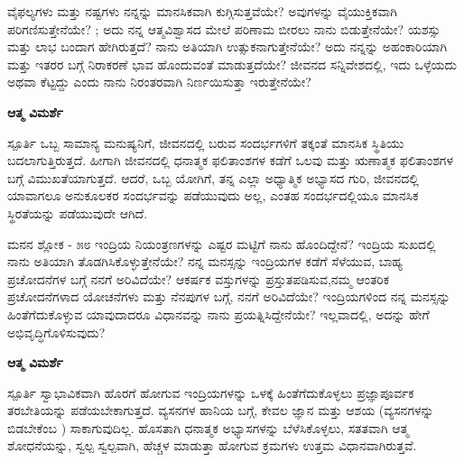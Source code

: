 \newpage
\begin{mananam}{}
\footnotesize \mananamtext ವೈಫಲ್ಯಗಳು ಮತ್ತು ನಷ್ಟಗಳು ನನ್ನನ್ನು ಮಾನಸಿಕವಾಗಿ  ಕುಗ್ಗಿಸುತ್ತವೆಯೇ? ಅವುಗಳನ್ನು ವೈಯುಕ್ತಿಕವಾಗಿ ಪರಿಗಣಿಸುತ್ತೇನೆಯೇ? ; ಅದು ನನ್ನ ಆತ್ಮವಿಶ್ವಾಸದ ಮೇಲೆ ಪರಿಣಾಮ ಬೀರಲು ನಾನು ಬಿಡುತ್ತೇನೆಯೇ? ಯಶಸ್ಸು ಮತ್ತು ಲಾಭ ಬಂದಾಗ ಹೇಗಿರುತ್ತದೆ? ನಾನು ಅತಿಯಾಗಿ  ಉತ್ಸುಕನಾಗುತ್ತೇನೆಯೇ? ಅದು ನನ್ನನ್ನು ಅಹಂಕಾರಿಯಾಗಿ ಮತ್ತು ಇತರರ ಬಗ್ಗೆ ನಿರಾಕರಣೆ ಭಾವ ಹೊಂದುವಂತೆ ಮಾಡುತ್ತದೆಯೇ? ಜೀವನದ ಸನ್ನಿವೇಶದಲ್ಲಿ, ಇದು ಒಳ್ಳೆಯದು ಅಥವಾ ಕೆಟ್ಟದ್ದು ಎಂದು ನಾನು ನಿರಂತರವಾಗಿ ನಿರ್ಣಯಿಸುತ್ತಾ ಇರುತ್ತೇನೆಯೇ?
\end{mananam}
\WritingHand\enspace\textbf{ಆತ್ಮ ವಿಮರ್ಶೆ}
\begin{inspiration}{\mananamfont ಸ್ಪೂರ್ತಿ}
\footnotesize \mananamtext ಒಬ್ಬ ಸಾಮಾನ್ಯ ಮನುಷ್ಯನಿಗೆ, ಜೀವನದಲ್ಲಿ ಬರುವ ಸಂದರ್ಭಗಳಿಗೆ ತಕ್ಕಂತೆ ಮಾನಸಿಕ ಸ್ಥಿತಿಯು ಬದಲಾಗುತ್ತಿರುತ್ತದೆ. ಹೀಗಾಗಿ ಜೀವನದಲ್ಲಿ ಧನಾತ್ಮಕ ಫಲಿತಾಂಶಗಳ ಕಡೆಗೆ ಒಲವು ಮತ್ತು ಋಣಾತ್ಮಕ ಫಲಿತಾಂಶಗಳ ಬಗ್ಗೆ ವಿಮುಖತೆಯಾಗುತ್ತದೆ. ಆದರೆ,  ಒಬ್ಬ ಯೋಗಿಗೆ, ತನ್ನ ಎಲ್ಲಾ ಅಧ್ಯಾತ್ಮಿಕ ಅಭ್ಯಾಸದ ಗುರಿ, ಜೀವನದಲ್ಲಿ ಯಾವಾಗಲೂ ಅನುಕೂಲಕರ ಸಂದರ್ಭವನ್ನು ಪಡೆಯುವುದು ಅಲ್ಲ, ಎಂತಹ ಸಂದರ್ಭದಲ್ಲಿಯೂ ಮಾನಸಿಕ ಸ್ಥಿರತೆಯನ್ನು ಪಡೆಯುವುದೇ ಆಗಿದೆ.
\end{inspiration}
\newpage

\begin{mananam}{\mananamfont ಮನನ ಶ್ಲೋಕ - ೫೮}
\footnotesize \mananamtext ಇಂದ್ರಿಯ ನಿಯಂತ್ರಣಗಳನ್ನು ಎಷ್ಟರ ಮಟ್ಟಿಗೆ ನಾನು ಹೊಂದಿದ್ದೇನೆ? ಇಂದ್ರಿಯ ಸುಖದಲ್ಲಿ ನಾನು ಅತಿಯಾಗಿ ತೊಡಗಿಸಿಕೊಳ್ಳುತ್ತೇನೆಯೇ? ನನ್ನ ಮನಸ್ಸನ್ನು ಇಂದ್ರಿಯಗಳ ಕಡೆಗೆ ಸೆಳೆಯುವ, ಬಾಹ್ಯ ಪ್ರಚೋದನೆಗಳ ಬಗ್ಗೆ ನನಗೆ ಅರಿವಿದೆಯೇ? ಆಕರ್ಷಕ ವಸ್ತುಗಳನ್ನು ಪ್ರಸ್ತುತಪಡಿಸುವ,ನಮ್ಮ ಆಂತರಿಕ ಪ್ರಚೋದನೆಗಳಾದ ಯೋಚನೆಗಳು ಮತ್ತು ನೆನಪುಗಳ ಬಗ್ಗೆ, ನನಗೆ ಅರಿವಿದೆಯೇ? ಇಂದ್ರಿಯಗಳಿಂದ ನನ್ನ ಮನಸ್ಸನ್ನು ಹಿಂತೆಗೆದುಕೊಳ್ಳುವ ಯಾವುದಾದರೂ ವಿಧಾನವನ್ನು ನಾನು ಪ್ರಯತ್ನಿಸಿದ್ದೇನೆಯೇ? ಇಲ್ಲವಾದಲ್ಲಿ, ಅದನ್ನು ಹೇಗೆ ಅಭಿವೃದ್ಧಿಗೊಳಿಸುವುದು?
\end{mananam}
\WritingHand\enspace\textbf{ಆತ್ಮ ವಿಮರ್ಶೆ}
\begin{inspiration}{\mananamfont ಸ್ಪೂರ್ತಿ}
\footnotesize \mananamtext ಸ್ವಾಭಾವಿಕವಾಗಿ ಹೊರಗೆ ಹೋಗುವ ಇಂದ್ರಿಯಗಳನ್ನು ಒಳಕ್ಕೆ ಹಿಂತೆಗೆದುಕೊಳ್ಳಲು ಪ್ರಜ್ಞಾಪೂರ್ವಕ ತರಬೇತಿಯನ್ನು ಪಡೆಯಬೇಕಾಗುತ್ತದೆ. ವ್ಯಸನಗಳ ಹಾನಿಯ ಬಗ್ಗೆ, ಕೇವಲ ಜ್ಞಾನ ಮತ್ತು ಆಶಯ (ವ್ಯಸನಗಳನ್ನು ಬಿಡಬೇಕೆಂಬ ) ಸಾಕಾಗುವುದಿಲ್ಲ. ಹೊಸತಾಗಿ ಧನಾತ್ಮಕ ಅಭ್ಯಾಸಗಳನ್ನು ಬೆಳೆಸಿಕೊಳ್ಳಲು, ಸತತವಾಗಿ ಆತ್ಮ ಶೋಧನೆಯನ್ನು, ಸ್ವಲ್ಪ ಸ್ವಲ್ಪವಾಗಿ, ಹೆಚ್ಚಳ ಮಾಡುತ್ತಾ ಹೋಗುವ ಕ್ರಮಗಳು ಉತ್ತಮ ವಿಧಾನವಾಗಿರುತ್ತವೆ.
\end{inspiration}
\newpage

